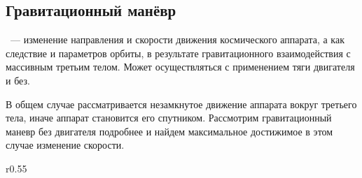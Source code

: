 \subsection{Гравитационный манёвр}
\label{sec:grav-assist}

~--- изменение направления и скорости движения космического аппарата, а как следствие и параметров орбиты, в результате гравитационного взаимодействия с массивным третьим телом. Может осуществляться с применением тяги двигателя и без.

В общем случае рассматривается незамкнутое движение аппарата вокруг третьего тела, иначе  аппарат становится его спутником. Рассмотрим гравитационный маневр без двигателя подробнее и найдем максимальное достижимое в этом случае изменение скорости.

\begin{wrapfigure}[16]{r}{0.55\tw}
    \centering
    \vspace{-0.5pc}
\end{wrapfigure}
